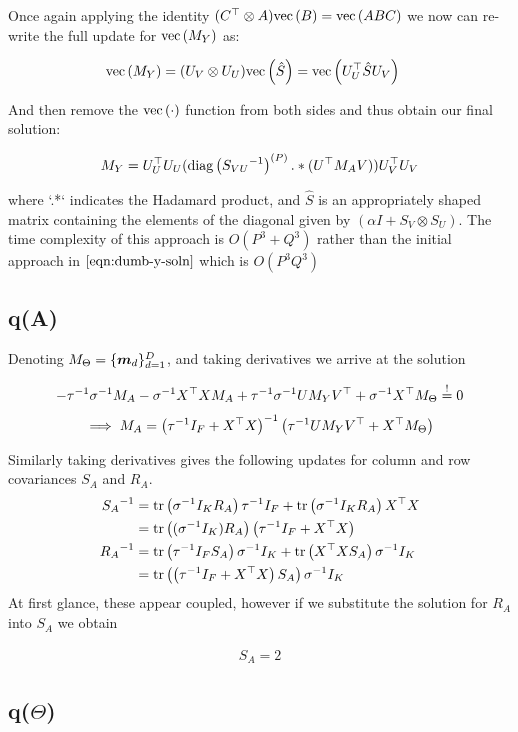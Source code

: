 Once again applying the identity $(C^\top \otimes A)\text{vec}\left(B\right) = \text{vec}\left(ABC\right)$ we now can re-write the full update for $\text{vec}\left(M_Y\right)$ as:

\begin{align}
\text{vec}\left(M_Y\right) & = (U_V \otimes U_U)\text{vec}\left(\hat S\right) = \text{vec}\left(U_U^\top \hat S U_V\right)
\end{align}

And then remove the $\text{vec}\left(\cdot\right)$ function from both sides and thus obtain our final solution:

\begin{align}
M_Y = U_U^\top U_U (\text{diag} \left( {{S_{VU}}^{-1}} \right)^{(P)} .* (U^\top M_A V)) U_V^\top U_V
\end{align}

where `.*` indicates the Hadamard product, and $\hat S$ is an appropriately shaped matrix containing the elements of the diagonal given by $(\alpha I + S_V \otimes S_U)$. The time complexity of this approach is $O(P^3 + Q^3)$ rather than the initial approach in $\eqref{eqn:dumb-y-soln}$ which is $O(P^3Q^3)$

\subsection{q(A)}
Denoting $M_\Theta = \{ \bm m_d \}_{d=1}^D$, and taking derivatives we arrive at the solution

\begin{align}
- {\tau}^{-1}{\sigma}^{-1} M_A 
- {\sigma}^{-1} X^\top X M_A
+ {\tau}^{-1} {\sigma}^{-1} UM_YV^\top
+ {\sigma}^{-1} X^\top M_\Theta
\overset{!}{=} 0\end{align}\begin{align}
\implies M_A = {\left( {\tau}^{-1} I_F + X^\top X \right)}^{-1}\left({\tau}^{-1} UM_YV^\top + X^\top M_\Theta \right)
\end{align}

Similarly taking derivatives gives the following updates for column and row covariances $S_A$ and $R_A$. 
\begin{align}
{S_A}^{-1}
    & = \text{tr} \left( {{\sigma}^{-1} I_K R_A} \right){\tau}^{-1} I_F + \text{tr} \left( {{\sigma}^{-1} I_K R_A} \right) X^\top X \\
    & = \text{tr} \left( {({\sigma}^{-1} I_K) R_A} \right)\left({\tau}^{-1} I_F + X^\top X\right) \\
{R_A}^{-1} 
    & = \text{tr} \left( {{\tau}^{-1} I_F S_A} \right){\sigma}^{-1} I_K + \text{tr} \left( {X^\top X S_A} \right){\sigma}^{-1} I_K \\
    & = \text{tr} \left( {\left({\tau}^{-1} I_F + X^\top X \right) S_A} \right){\sigma}^{-1} I_K
\end{align}
At first glance, these appear coupled, however if we substitute the solution for $R_A$ into $S_A$ we obtain

\begin{align}
S_A = 2
\end{align}






\subsection{q($\Theta$)}



